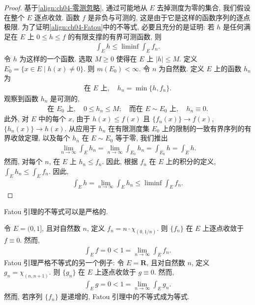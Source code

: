\documentclass[../../main.tex]{subfiles}
\begin{document}
\begin{proof}
基于\eqref{align:ch04-零测忽略}, 通过可能地从 $E$ 去掉测度为零的集合, 我们假设在整个 $E$ 逐点收敛. 函数 $f$ 是非负与可测的, 这是由于它是这样的函数序列的逐点极限. 为了证明\eqref{align:ch04-Fatou}中的不等式, 必要且充分的是证明: 若 $h$ 是任何满足在 $E$ 上 $0\leqslant h\leqslant f$ 的有限支撑的有界可测函数, 则
\begin{align}
\int_{E}h\leqslant\liminf\int_{E}f_{n}.\label{align:ch04-Fatou关键}
\end{align}
令 $h$ 为这样的一个函数. 选取 $M\geqslant 0$ 使得在 $E$ 上 $|h|\leqslant M$. 定义 $E_{0}=\{x\in E\mid h(x)\neq 0\}$. 则 $m(E_{0})<\infty$. 令 $n$ 为自然数. 定义 $E$ 上的函数 $h_{n}$ 为
\begin{align*}
\text{在 }E\text{ 上},\quad h_{n}=\min\{h,f_{n}\}.
\end{align*}
观察到函数 $h_{n}$ 是可测的,
\begin{align*}
\text{在 }E_{0}\text{ 上},\quad 0\leqslant h_{n}\leqslant M;\quad\text{而在 }E\sim E_{0}\text{ 上},\quad h_{n}\equiv 0.
\end{align*}
此外, 对 $E$ 中的每个 $x$, 由于 $h(x)\leqslant f(x)$ 且 $\{f_{n}(x)\}\to f(x)$, $\{h_{n}(x)\}\to h(x)$. 从应用于 $h_{n}$ 在有限测度集 $E_{0}$ 上的限制的一致有界序列的有界收敛定理, 以及每个 $h_{n}$ 在 $E\sim E_{0}$ 等于零, 我们推出
\begin{align*}
\lim_{n\to\infty}\int_{E}h_{n}=\lim_{n\to\infty}\int_{E_{0}}h_{n}=\int_{E_{0}}h=\int_{E}h.
\end{align*}
然而, 对每个 $n$, 在 $E$ 上 $h_{n}\leqslant f_{n}$. 因此, 根据 $f_{n}$ 在 $E$ 上的积分的定义, $\int_{E}h_{n}\leqslant\int_{E}f_{n}$. 因此,
\begin{align*}
\int_{E}h=\lim_{n\to\infty}\int_{E}h_{n}\leqslant\liminf\int_{E}f_{n}.
\end{align*}
\end{proof}

Fatou 引理的不等式可以是严格的.

\begin{example}\label{example:ch04-Fatou严格}
令 $E=(0,1]$, 且对自然数 $n$, 定义 $f_{n}=n\cdot\chi_{(0,1/n)}$. 则 $\{f_{n}\}$ 在 $E$ 上逐点收敛于 $f\equiv 0$. 然而,
\begin{align*}
\int_{E}f=0<1=\lim_{n\to\infty}\int_{E}f_{n}.
\end{align*}
Fatou 引理严格不等式的另一个例子: 令 $E=\mathbf{R}$, 且对自然数 $n$, 定义 $g_{n}=\chi_{(n,n+1)}$. 则 $\{g_{n}\}$ 在 $E$ 上逐点收敛于 $g\equiv 0$. 然而,
\begin{align*}
\int_{E}g=0<1=\lim_{n\to\infty}\int_{E}g_{n}.
\end{align*}
然而, 若序列 $\{f_{n}\}$ 是递增的, Fatou 引理中的不等式成为等式.
\end{example}
\end{document}

